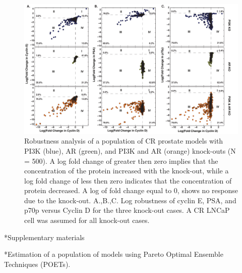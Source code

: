 \documentclass[12pt]{article}
\makeatletter
\renewcommand\subsection{\@startsection
	{subsection}{2}{0mm}
	{-0.05in}
	{-0.5\baselineskip}
	{\normalfont\normalsize\bfseries}}
\renewcommand\section{\@startsection
	{subsection}{2}{0mm}
	{-0.2in}
	{0.05\baselineskip}
	{\normalfont\large\bfseries}}
\makeatother
\begin{document}
\clearpage

\begin{figure}\centering
\includegraphics[width=1.0\textwidth]{./figs/Fig_8_PI3K_AR_KO_3_Cases.pdf}
\caption{Robustness analysis of a population of CR prostate models with PI3K (blue), AR (green), and PI3K and AR (orange) knock-outs (N = 500). A log fold change of greater then zero implies that the concentration of the protein increased with the knock-out, while a log fold change of less then zero indicates that the concentration of protein decreased. A log of fold change equal to 0, shows no response due to the knock-out.
 A.,B.,C. Log robustness of cyclin E, PSA, and p70p versus Cyclin D for the three knock-out cases. A CR LNCaP cell was assumed for all knock-out cases.}
\label{fg:Dual_Knockout}
\end{figure}

\clearpage

\renewcommand\thefigure{S\arabic{figure}}
\renewcommand\thetable{T\arabic{table}}
\renewcommand\thepage{S-\arabic{page}}
\renewcommand\theequation{S\arabic{equation}}

\setcounter{equation}{0}
\setcounter{table}{0}
\setcounter{figure}{0}
\setcounter{page}{1}

\section*{Supplementary materials}

\subsection*{Estimation of a population of models using Pareto Optimal Ensemble Techniques (POETs).}
\end{document}
